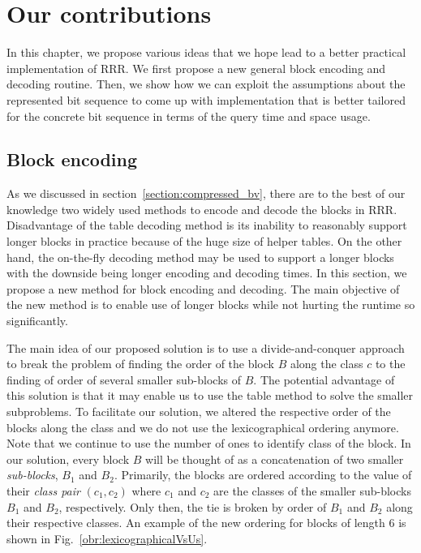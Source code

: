 \chapter{Our contributions}
\label{kap:kap3}

In this chapter, we propose various ideas that we hope lead to a better practical
implementation of RRR. We first propose a new general block encoding and decoding routine.
Then, we show how we can exploit the assumptions about the represented bit sequence to
come up with implementation that is better tailored for the concrete bit sequence in terms of
the query time and space usage.

\section{Block encoding}

As we discussed in section~\ref{section:compressed_bv}, there are to
the best of our knowledge two widely used methods to encode and decode the
blocks in RRR. Disadvantage of the table decoding method is its inability
to reasonably support longer blocks in practice because of the huge size of
helper tables. On the other hand, the on-the-fly decoding method may be used
to support a longer blocks with the downside being longer encoding and decoding
times. In this section, we propose a new method for block encoding and decoding.
The main objective of the new method is to enable use of longer blocks while not
hurting the runtime so significantly.

The main idea of our proposed solution is to use a divide-and-conquer approach to
break the problem of finding the order of the block $B$ along the class $c$ to
the finding of order of several smaller sub-blocks of $B$. The potential advantage of this
solution is that it may enable us to use the table method to solve the smaller
subproblems. To facilitate our solution, we altered the respective order of the blocks
along the class and we do not use the lexicographical ordering anymore. Note that we
continue to use the number of ones to identify class of the block. In our solution, every
block $B$ will be thought of as a concatenation of two smaller \textit{sub-blocks}, $B_1$
and $B_2$. Primarily, the blocks are ordered according to the value of their \textit{class pair}
$(c_1, c_2)$ where $c_1$ and $c_2$ are the classes of the smaller sub-blocks $B_1$ and $B_2$,
respectively. Only then, the tie is broken by order of $B_1$ and $B_2$ along their respective
classes. An example of the new ordering for blocks of length 6 is shown in Fig.~\ref{obr:lexicographicalVsUs}.

